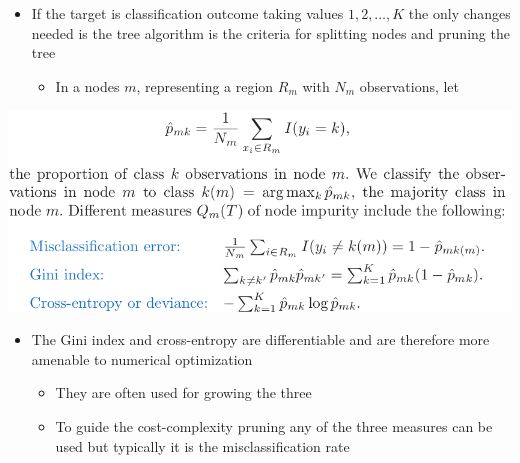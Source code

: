 \documentclass[11pt]{article}
\begin{document}
\begin{itemize}
\item If the target is classification outcome taking values \(1,2,\dots, K\) the only changes needed is the tree algorithm is the criteria for splitting nodes and pruning the tree
\begin{itemize}
\item In a nodes \(m\), representing a region \(R_m\) with \(N_m\) observations, let
\end{itemize}
\end{itemize}
\begin{center}
\includegraphics[width=.9\linewidth]{Tree-Based Methods/screenshot_2018-10-08_16-47-14.png}
\end{center}
\begin{itemize}
\item The Gini index and cross-entropy are differentiable and are therefore more amenable to numerical optimization
\begin{itemize}
\item They are often used for growing the three
\item To guide the cost-complexity pruning any of the three measures can be used but typically it is the misclassification rate
\end{itemize}
\end{itemize}
\end{document}
